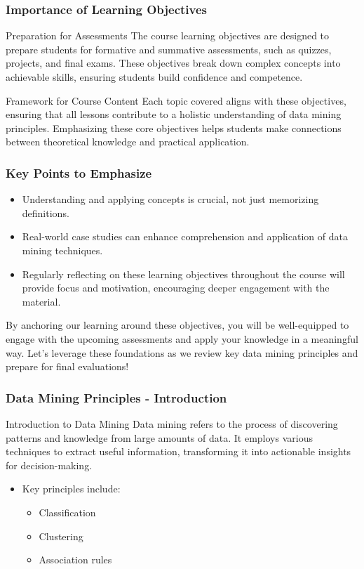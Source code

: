 \documentclass[aspectratio=169]{beamer}
\begin{document}
\begin{frame}[fragile]
    \frametitle{Importance of Learning Objectives}
    \begin{block}{Preparation for Assessments}
        The course learning objectives are designed to prepare students for formative and summative assessments, such as quizzes, projects, and final exams. These objectives break down complex concepts into achievable skills, ensuring students build confidence and competence.
    \end{block}

    \begin{block}{Framework for Course Content}
        Each topic covered aligns with these objectives, ensuring that all lessons contribute to a holistic understanding of data mining principles. Emphasizing these core objectives helps students make connections between theoretical knowledge and practical application.
    \end{block}
\end{frame}

\begin{frame}[fragile]
    \frametitle{Key Points to Emphasize}
    \begin{itemize}
        \item Understanding and applying concepts is crucial, not just memorizing definitions.
        \item Real-world case studies can enhance comprehension and application of data mining techniques.
        \item Regularly reflecting on these learning objectives throughout the course will provide focus and motivation, encouraging deeper engagement with the material.
    \end{itemize}

    By anchoring our learning around these objectives, you will be well-equipped to engage with the upcoming assessments and apply your knowledge in a meaningful way. Let’s leverage these foundations as we review key data mining principles and prepare for final evaluations!
\end{frame}

\begin{frame}[fragile]
    \frametitle{Data Mining Principles - Introduction}
    \begin{block}{Introduction to Data Mining}
        Data mining refers to the process of discovering patterns and knowledge from large amounts of data. It employs various techniques to extract useful information, transforming it into actionable insights for decision-making. 
    \end{block}
    \begin{itemize}
        \item Key principles include:
        \begin{itemize}
            \item Classification
            \item Clustering
            \item Association rules
        \end{itemize}
    \end{itemize}
\end{frame}
\end{document}
